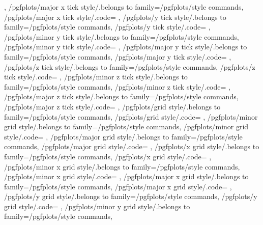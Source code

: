 {{		%
	},
	/pgfplots/major x tick style/.belongs to family=/pgfplots/style commands,
	/pgfplots/major x tick style/.code={%
	},
	/pgfplots/y tick style/.belongs to family=/pgfplots/style commands,
	/pgfplots/y tick style/.code={%
	},
	/pgfplots/minor y tick style/.belongs to family=/pgfplots/style commands,
	/pgfplots/minor y tick style/.code={%
	},
	/pgfplots/major y tick style/.belongs to family=/pgfplots/style commands,
	/pgfplots/major y tick style/.code={%
	},
	/pgfplots/z tick style/.belongs to family=/pgfplots/style commands,
	/pgfplots/z tick style/.code={%
	},
	/pgfplots/minor z tick style/.belongs to family=/pgfplots/style commands,
	/pgfplots/minor z tick style/.code={%
	},
	/pgfplots/major z tick style/.belongs to family=/pgfplots/style commands,
	/pgfplots/major z tick style/.code={%
	},
	/pgfplots/grid style/.belongs to family=/pgfplots/style commands,
	/pgfplots/grid style/.code={%
	},
	/pgfplots/minor grid style/.belongs to family=/pgfplots/style commands,
	/pgfplots/minor grid style/.code={%
	},
	/pgfplots/major grid style/.belongs to family=/pgfplots/style commands,
	/pgfplots/major grid style/.code={%
	},
	/pgfplots/x grid style/.belongs to family=/pgfplots/style commands,
	/pgfplots/x grid style/.code={%
	},
	/pgfplots/minor x grid style/.belongs to family=/pgfplots/style commands,
	/pgfplots/minor x grid style/.code={%
	},
	/pgfplots/major x grid style/.belongs to family=/pgfplots/style commands,
	/pgfplots/major x grid style/.code={%
	},
	/pgfplots/y grid style/.belongs to family=/pgfplots/style commands,
	/pgfplots/y grid style/.code={%
	},
	/pgfplots/minor y grid style/.belongs to family=/pgfplots/style commands,
}
